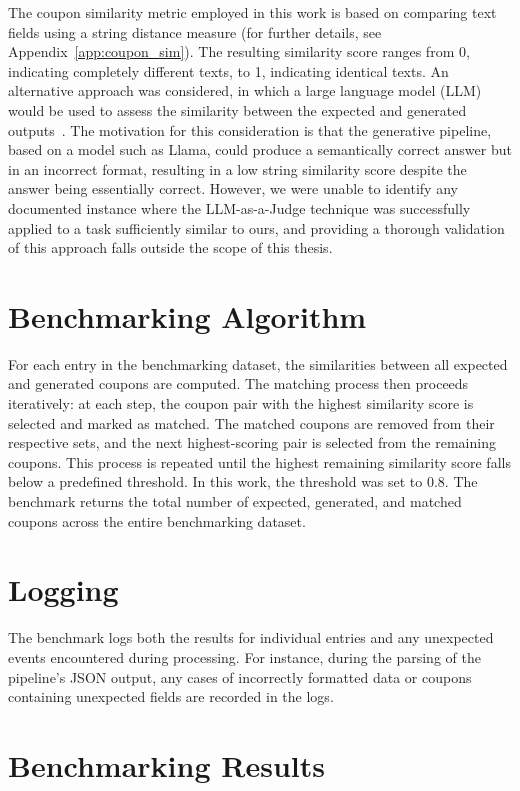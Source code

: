\documentclass[licencjacka,en]{pracamgr}
\begin{document}
The coupon similarity metric employed in this work is based on comparing text fields using a string distance measure (for further details, see Appendix~\ref{app:coupon_sim}). The resulting similarity score ranges from 0, indicating completely different texts, to 1, indicating identical texts. An alternative approach was considered, in which a large language model (LLM) would be used to assess the similarity between the expected and generated outputs~\cite{llm-as-a-judge}. The motivation for this consideration is that the generative pipeline, based on a model such as Llama, could produce a semantically correct answer but in an incorrect format, resulting in a low string similarity score despite the answer being essentially correct. However, we were unable to identify any documented instance where the LLM-as-a-Judge technique was successfully applied to a task sufficiently similar to ours, and providing a thorough validation of this approach falls outside the scope of this thesis.

\section{Benchmarking Algorithm}

For each entry in the benchmarking dataset, the similarities between all expected and generated coupons are computed. The matching process then proceeds iteratively: at each step, the coupon pair with the highest similarity score is selected and marked as matched. The matched coupons are removed from their respective sets, and the next highest-scoring pair is selected from the remaining coupons. This process is repeated until the highest remaining similarity score falls below a predefined threshold. In this work, the threshold was set to 0.8. The benchmark returns the total number of expected, generated, and matched coupons across the entire benchmarking dataset.

\section{Logging}

The benchmark logs both the results for individual entries and any unexpected events encountered during processing. For instance, during the parsing of the pipeline’s JSON output, any cases of incorrectly formatted data or coupons containing unexpected fields are recorded in the logs.

\section{Benchmarking Results} \label{benchmarkResults}
\end{document}
